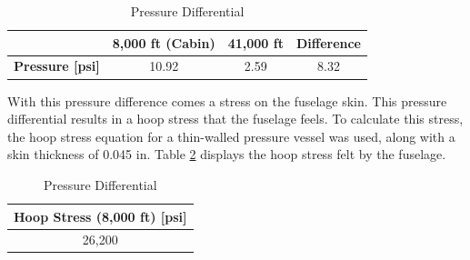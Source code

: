 \begin{table}[!h]
    \centering
    \caption{Pressure Differential}
    \begin{tabular}{|c|c|c|c|}\toprule 
     & \textbf{8,000 ft (Cabin)} & \textbf{41,000 ft} & \textbf{Difference} \\ \hline 
    \textbf{Pressure [psi]} & 10.92 & 2.59 & 8.32 \\ 
    \bottomrule
    \end{tabular}
    \label{tab:pres}
\end{table}

With this pressure difference comes a stress on the fuselage skin. This pressure differential results in a hoop stress that the fuselage feels. To calculate this stress, the hoop stress equation for a thin-walled pressure vessel was used, along with a skin thickness of 0.045 in. Table \ref{hoopstrs} displays the hoop stress felt by the fuselage.

\begin{table}[!h]
    \centering
    \caption{Pressure Differential}
    \begin{tabular}{|c|}\toprule 
    \textbf{Hoop Stress (8,000 ft) [psi]} \\ \hline
    26,200 \\ 
    \bottomrule
    \end{tabular}
    \label{hoopstrs}
\end{table}

